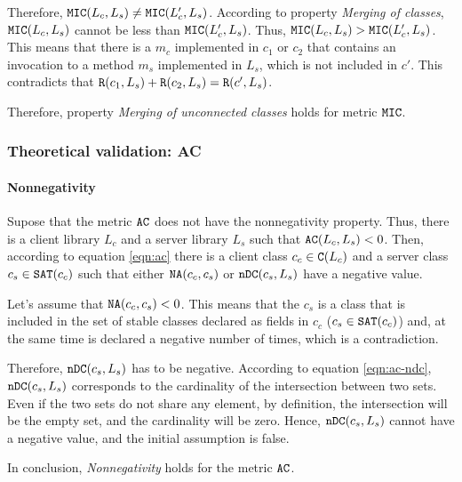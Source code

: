 Therefore, $\verb|MIC|(L_c, L_s) \neq \verb|MIC|(L_c', L_s)$. According to property \textit{Merging of classes}, $\verb|MIC|(L_c, L_s)$ cannot be less than $\verb|MIC|(L_c', L_s)$. Thus, $\verb|MIC|(L_c, L_s) > \verb|MIC|(L_c', L_s)$. This means that there is a $m_c$ implemented in $c_1$ or $c_2$ that contains an invocation to a method $m_s$ implemented in $L_s$, which is not included in $c'$. This contradicts that $\verb|R|(c_1, L_s) + \verb|R|(c_2, L_s) = \verb|R|(c', L_s)$.

Therefore, property \textit{Merging of unconnected classes} holds for metric $\verb|MIC|$.

\subsubsection{Theoretical validation: AC}

\paragraph{Nonnegativity}
Supose that the metric $\verb|AC|$ does not have the nonnegativity property. Thus, there is a client library $L_c$ and a server library $L_s$ such that $\verb|AC|(L_c, L_s) < 0$. Then, according to equation \ref{eqn:ac} there is a client class $c_c \in \verb|C|(L_c)$ and a server class $c_s \in \verb|SAT|(c_c)$ such that either $\verb|NA|(c_c, c_s)$ or $\verb|nDC|(c_s, L_s)$ have a negative value.

Let's assume that $\verb|NA|(c_c, c_s) < 0$. This means that the $c_s$ is a class that is included in the set of stable classes declared as fields in $c_c$ ($c_s \in \verb|SAT|(c_c)$) and, at the same time is declared a negative number of times, which is a contradiction.

Therefore, $\verb|nDC|(c_s, L_s)$ has to be negative. According to equation \ref{eqn:ac-ndc}, $\verb|nDC|(c_s, L_s)$ corresponds to the cardinality of the intersection between two sets. Even if the two sets do not share any element, by definition, the intersection will be the empty set, and the cardinality will be zero. Hence, $\verb|nDC|(c_s, L_s)$ cannot have a negative value, and the initial assumption is false.

In conclusion, \textit{Nonnegativity} holds for the metric $\verb|AC|$.

